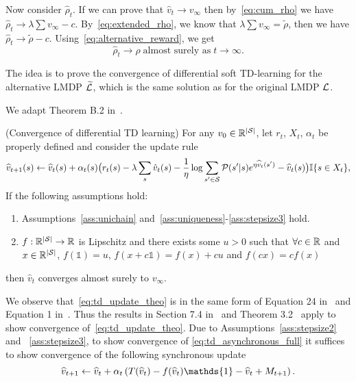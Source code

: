 Now consider $\hat\rho_t$. If we can prove that $\hat v_t\rightarrow v_\infty$ then by~\eqref{eq:cum_rho} we have $\hat\rho_t\rightarrow\lambda\sum v_\infty - c$. By~\eqref{eq:extended_rho}, we know that $\lambda\sum v_\infty = \widetilde\rho$, then we have $\hat\rho_t\rightarrow\widetilde\rho-c$. Using~\eqref{eq:alternative_reward}, we get 
\begin{equation*}
    \hat\rho_t\rightarrow\rho\;\text{almost surely as}\;t\rightarrow\infty.
\end{equation*}

The idea is to prove the convergence of differential soft TD-learning for the alternative LMDP $\widetilde{\mathcal{L}}$, which is the same solution as for the original LMDP $\mathcal{L}$.

We adapt Theorem B.2 in~\cite{Wan2021}.

\begin{theorem} (Convergence of differential TD learning)
    For any $v_0\in\mathbb{R}^{\lvert\mathcal{S}\rvert}$, let $r_t$, $X_t$, $\alpha_t$ be properly defined and consider the update rule
    \begin{equation}
        \widehat{v}_{t+1}(s) \gets \widehat{v}_t(s) + \alpha_t(s) \big( r_t(s) - \lambda\sum_s \hat v_t(s) - \frac 1 \eta \log \sum_{s'\in\mathcal{S}} \mathcal{P}(s'|s) e^{\eta \widehat{v}_t(s')} - \widehat{v}_t(s)\big)  \mathbb{I}\{s\in X_t\},
        \label{eq:td_update_theo}
    \end{equation}
    If the following assumptions hold:
    \begin{enumerate}
        \item Assumptions~\ref{ass:unichain} and~\ref{ass:uniqueness}-\ref{ass:stepsize3} hold.
        \item $f:\mathbb{R}^{\lvert\mathcal{S}\rvert}\rightarrow\mathbb{R}$ is Lipschitz and there exists some $u>0$ such that $\forall c\in\mathbb{R}$ and $x\in\mathbb{R}^{\lvert\mathcal{S}\rvert}$, $f(\mathds{1})=u$, $f(x + c\mathds{1})=f(x)+cu$ and $f(cx) = c f(x)$
    \end{enumerate}
    then $\hat v_t$ converges almost surely to $v_\infty$.
    \label{theo:our_theorem}
\end{theorem}

We observe that~\eqref{eq:td_update_theo} is in the same form of Equation 24 in~\cite{Wan2021} and Equation 1 in~\cite{Borkar2009}. Thus the results in Section 7.4 in~\cite{Borkar2009} and Theorem 3.2~\cite{Borkar1998} apply to show convergence of~\eqref{eq:td_update_theo}. Due to Assumptions~\ref{ass:stepsize2} and ~\ref{ass:stepsize3}, to show convergence of \eqref{eq:td_asynchronous_full} it suffices to show convergence of the following synchronous update
\begin{equation}
    \widehat{v}_{t+1} \gets \widehat{v}_t + \alpha_t \pa{ T(\widehat{v}_t) - f(\widehat{v}_t) \mathds{1} - \widehat{v}_t + M_{t+1}}.
    \label{eq:synchronous}
\end{equation}

